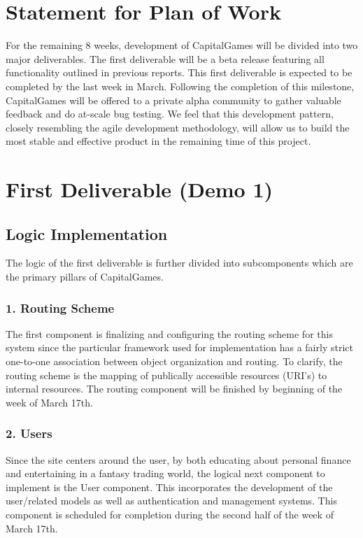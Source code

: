 \section{Statement for Plan of Work}
For the remaining 8 weeks, development of CapitalGames will be divided into two major deliverables. The first deliverable will be a beta release featuring all functionality outlined in previous reports. This first deliverable is expected to be completed by the last week in March. Following the completion of this milestone, CapitalGames will be offered to a private alpha community to gather valuable feedback and do at-scale bug testing. We feel that this development pattern, closely resembling the agile development methodology, will allow us to build the most stable and effective product in the remaining time of this project.  \\

\section{First Deliverable (Demo 1)}
\subsection{Logic Implementation}
The logic of the first deliverable is further divided into subcomponents which are the primary pillars of CapitalGames. \\
\subsubsection{1. Routing Scheme}
The first component is finalizing and configuring the routing scheme for this system since the particular framework used for implementation has a fairly strict one-to-one association between object organization and routing. To clarify, the routing scheme is the mapping of publically accessible resources (URI’s) to internal resources. The routing component will be finished by beginning of the week of March 17th. \\
\subsubsection{2. Users}
Since the site centers around the user, by both educating about personal finance and entertaining in a fantasy trading world, the logical next component to implement is the User component. This incorporates the development of the user/related models as well as authentication and management systems. This component is scheduled for completion during the second half of the week of March 17th. \\
